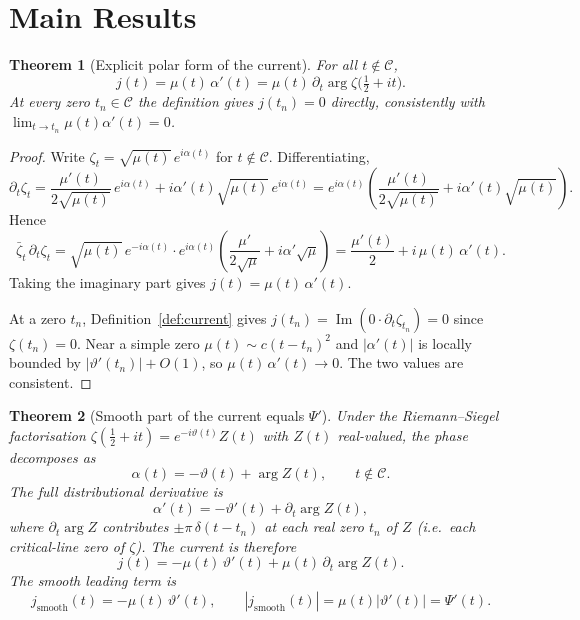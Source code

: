 \documentclass[11pt]{article}
\theoremstyle{plain}
\newtheorem{theorem}{Theorem}
\theoremstyle{definition}
\theoremstyle{remark}
\DeclareMathOperator{\im}{Im}
\begin{document}
\section{Main Results}

\begin{theorem}[Explicit polar form of the current]
\label{thm:polar}
For all $t \notin \mathcal{C}$,
\[
j(t) = \mu(t)\,\alpha'(t) = \mu(t)\,\partial_t\arg\zeta\!\bigl(\tfrac{1}{2}+it\bigr).
\]
At every zero $t_n \in \mathcal{C}$ the definition gives $j(t_n)=0$
directly, consistently with $\lim_{t\to t_n} \mu(t)\alpha'(t) = 0$.
\end{theorem}

\begin{proof}
Write $\zeta_t = \sqrt{\mu(t)}\,e^{i\alpha(t)}$ for $t\notin\mathcal{C}$.
Differentiating,
\[
\partial_t\zeta_t
= \frac{\mu'(t)}{2\sqrt{\mu(t)}}\,e^{i\alpha(t)}
+ i\alpha'(t)\sqrt{\mu(t)}\,e^{i\alpha(t)}
= e^{i\alpha(t)}\!\left(\frac{\mu'(t)}{2\sqrt{\mu(t)}}
+ i\alpha'(t)\sqrt{\mu(t)}\right).
\]
Hence
\[
\bar\zeta_t\,\partial_t\zeta_t
= \sqrt{\mu(t)}\,e^{-i\alpha(t)}\cdot e^{i\alpha(t)}
\!\left(\frac{\mu'}{2\sqrt{\mu}}+i\alpha'\sqrt{\mu}\right)
= \frac{\mu'(t)}{2} + i\,\mu(t)\,\alpha'(t).
\]
Taking the imaginary part gives $j(t) = \mu(t)\,\alpha'(t)$.

At a zero $t_n$, Definition~\ref{def:current} gives
$j(t_n) = \im(0\cdot\partial_t\zeta_{t_n}) = 0$ since
$\zeta(t_n)=0$. Near a simple zero $\mu(t)\sim c(t-t_n)^2$ and
$|\alpha'(t)|$ is locally bounded by $|\vartheta'(t_n)| + O(1)$, so
$\mu(t)\,\alpha'(t)\to 0$. The two values are consistent.
\end{proof}

\begin{theorem}[Smooth part of the current equals $\Psi'$]
\label{thm:smooth}
Under the Riemann--Siegel factorisation $\zeta(\tfrac{1}{2}+it)
= e^{-i\vartheta(t)}Z(t)$ with $Z(t)$ real-valued, the phase
decomposes as
\[
\alpha(t) = -\vartheta(t) + \arg Z(t),\qquad t\notin\mathcal{C}.
\]
The full distributional derivative is
\[
\alpha'(t)
= -\vartheta'(t) + \partial_t\arg Z(t),
\]
where $\partial_t\arg Z$ contributes $\pm\pi\,\delta(t-t_n)$ at each
real zero $t_n$ of $Z$ (i.e.\ each critical-line zero of $\zeta$).
The current is therefore
\[
j(t) = -\mu(t)\,\vartheta'(t) + \mu(t)\,\partial_t\arg Z(t).
\]
The smooth leading term is
\[
j_{\mathrm{smooth}}(t) = -\mu(t)\,\vartheta'(t),
\qquad
|j_{\mathrm{smooth}}(t)| = \mu(t)|\vartheta'(t)| = \Psi'(t).
\]
\end{theorem}
\end{document}
